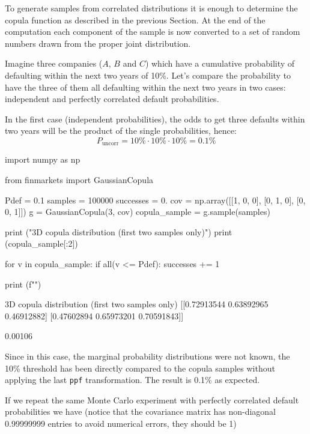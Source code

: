 To generate samples from correlated distributions it is enough to determine the copula function as described in the previous Section.
At the end of the computation each component of the sample is now converted to a set of random numbers drawn from the proper joint distribution.

Imagine three companies ($A$, $B$ and $C$) which have a cumulative probability of defaulting within the next two years of 10\%.
Let's compare the probability to have the three of them all defaulting within the next two years in two cases: independent and perfectly correlated default probabilities.

In the first case (independent probabilities), the odds to get three defaults within two years will be the product of the single probabilities, hence:
\begin{equation}
P_{\mathrm{uncorr}} = 10\% \cdot 10\% \cdot 10\% = 0.1 \%
\end{equation}

\begin{ipython}
import numpy as np

from finmarkets import GaussianCopula

Pdef = 0.1
samples = 100000
successes = 0.
cov = np.array([[1, 0, 0],
                [0, 1, 0],
                [0, 0, 1]])
g = GaussianCopula(3, cov)
copula_sample = g.sample(samples)

print ("\n3D copula distribution (first two samples only)")
print (copula_sample[:2])

for v in copula_sample:
    if all(v <= Pdef):
        successes += 1
        
print (f"")
\end{ipython}
\begin{ioutput}
3D copula distribution (first two samples only)
[[0.72913544 0.63892965 0.46912882]
 [0.47602894 0.65973201 0.70591843]]

0.00106
\end{ioutput}
\noindent
Since in this case, the marginal probability distributions were not known, the 10\% threshold has been directly compared to the copula samples without applying the last \texttt{ppf} transformation.
The result is 0.1\% as expected.

If we repeat the same Monte Carlo experiment with perfectly correlated default probabilities we have (notice that the covariance matrix has non-diagonal 0.99999999 entries to avoid numerical errors, they should be 1)

